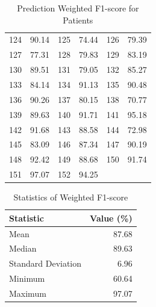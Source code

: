 \documentclass{article}
\begin{document}
\begin{table}[H]
\begin{tabular*}{\textwidth}{@{\extracolsep{\fill}}cccccc}
124 & 90.14 & 125 & 74.44 & 126 & 79.39 \\
127 & 77.31 & 128 & 79.83 & 129 & 83.19 \\
130 & 89.51 & 131 & 79.05 & 132 & 85.27 \\
133 & 84.14 & 134 & 91.13 & 135 & 90.48 \\
136 & 90.26 & 137 & 80.15 & 138 & 70.77 \\
139 & 89.63 & 140 & 91.71 & 141 & 95.18 \\
142 & 91.68 & 143 & 88.58 & 144 & 72.98 \\
145 & 83.09 & 146 & 87.34 & 147 & 90.19 \\
148 & 92.42 & 149 & 88.68 & 150 & 91.74 \\
151 & 97.07 & 152 & 94.25 & & \\

\bottomrule    
\end{tabular*}
\caption{Prediction Weighted F1-score for Patients}
\label{tab:accuracy}
\end{table}

\begin{table}[H]
\centering
\begin{tabular*}{\textwidth}{@{\extracolsep{\fill}}lr}
\toprule
\textbf{Statistic} & \textbf{Value (\%)} \\
\midrule
    
Mean & 87.68 \\
Median & 89.63 \\
Standard Deviation & 6.96 \\
Minimum & 60.64 \\
Maximum & 97.07 \\

\bottomrule
\end{tabular*}
\caption{Statistics of Weighted F1-score}
\label{tab:stats}
\end{table}
\end{document}
